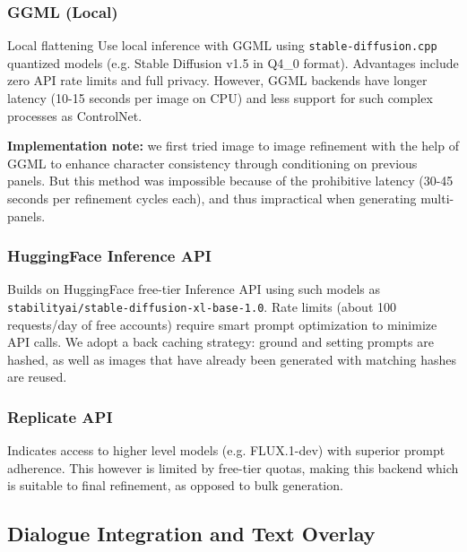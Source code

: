 \documentclass[runningheads]{llncs}
\begin{document}
\subsubsection{GGML (Local)}

Local flattening Use local inference with GGML using \texttt{stable-diffusion.cpp} quantized models (e.g. Stable Diffusion v1.5 in Q4\_0 format). Advantages include zero API rate limits and full privacy. However, GGML backends have longer latency (10-15 seconds per image on CPU) and less support for such complex processes as ControlNet.

\textbf{Implementation note:} we first tried image to image refinement with the help of GGML to enhance character consistency through conditioning on previous panels. But this method was impossible because of the prohibitive latency (30-45 seconds per refinement cycles each), and thus impractical when generating multi-panels.

\subsubsection{HuggingFace Inference API}

Builds on HuggingFace free-tier Inference API using such models as \texttt{stabilityai/stable-diffusion-xl-base-1.0}. Rate limits (about 100 requests/day of free accounts) require smart prompt optimization to minimize API calls. We adopt a back caching strategy: ground and setting prompts are hashed, as well as images that have already been generated with matching hashes are reused.

\subsubsection{Replicate API}

Indicates access to higher level models (e.g. FLUX.1-dev) with superior prompt adherence. This however is limited by free-tier quotas, making this backend which is suitable to final refinement, as opposed to bulk generation.

\subsection{Dialogue Integration and Text Overlay}
\end{document}
